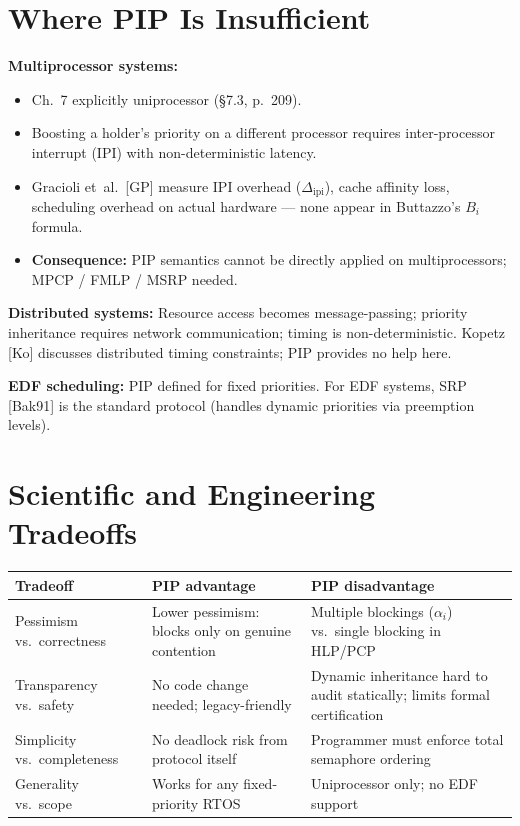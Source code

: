 \documentclass[conference,onecolumn]{IEEEtran}
\begin{document}
\section{Where PIP Is Insufficient}

\textbf{Multiprocessor systems:}
\begin{itemize}
  \item Ch.~7 explicitly uniprocessor (\S7.3, p.~209).
  \item Boosting a holder's priority on a different processor requires
        inter-processor interrupt (IPI) with non-deterministic latency.
  \item Gracioli et~al.\ [GP] measure IPI overhead ($\Delta_\mathrm{ipi}$),
        cache affinity loss, scheduling overhead on actual hardware ---
        none appear in Buttazzo's $B_i$ formula.
  \item \textbf{Consequence:} PIP semantics cannot be directly applied
        on multiprocessors; MPCP / FMLP / MSRP needed.
\end{itemize}

\textbf{Distributed systems:}
Resource access becomes message-passing; priority inheritance requires
network communication; timing is non-deterministic. Kopetz [Ko] discusses
distributed timing constraints; PIP provides no help here.

\textbf{EDF scheduling:}
PIP defined for fixed priorities. For EDF systems, SRP [Bak91]
is the standard protocol (handles dynamic priorities via preemption levels).

\section{Scientific and Engineering Tradeoffs}

{\small\begin{tabular}{@{}lp{5cm}p{4.5cm}@{}}
\toprule
Tradeoff & PIP advantage & PIP disadvantage \\
\midrule
Pessimism vs.\ correctness & Lower pessimism: blocks only on genuine contention & Multiple blockings ($\alpha_i$) vs.\ single blocking in HLP/PCP \\
Transparency vs.\ safety & No code change needed; legacy-friendly & Dynamic inheritance hard to audit statically; limits formal certification \\
Simplicity vs.\ completeness & No deadlock risk from protocol itself & Programmer must enforce total semaphore ordering \\
Generality vs.\ scope & Works for any fixed-priority RTOS & Uniprocessor only; no EDF support \\
\bottomrule
\end{tabular}}
\end{document}
